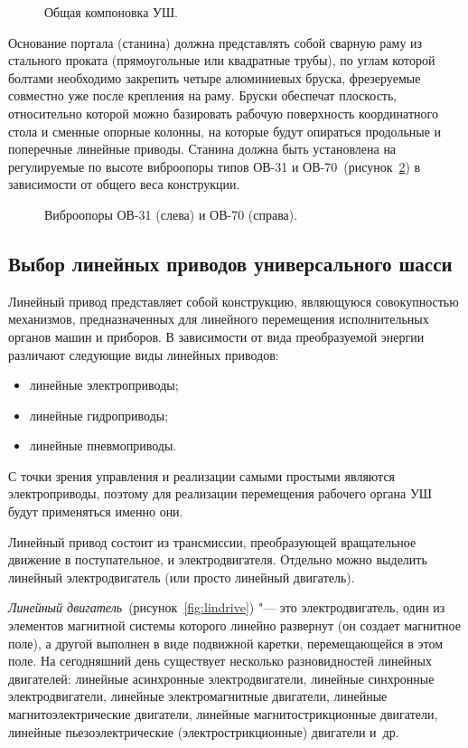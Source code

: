\begin{figure}[ht]
	\caption{Общая компоновка УШ.}\label{fig:coord-chassis}
\end{figure}

Основание портала (станина) должна представлять собой сварную раму из стального проката (прямоугольные или квадратные трубы), по углам которой болтами необходимо закрепить четыре алюминиевых бруска, фрезеруемые совместно уже после крепления на раму. Бруски обеспечат плоскость, относительно которой можно базировать рабочую поверхность координатного стола и сменные опорные колонны, на которые будут опираться продольные и поперечные линейные приводы. Станина должна быть установлена на регулируемые по высоте виброопоры типов ОВ-31 и ОВ-70~(рисунок~\cref{fig:vibro}) в зависимости от общего веса конструкции.

\begin{figure}[ht]
	\caption{Виброопоры ОВ-31 (слева) и ОВ-70 (справа).}\label{fig:vibro}
\end{figure}

\subsection{Выбор линейных приводов универсального шасси}

Линейный привод представляет собой конструкцию, являющуюся совокупностью механизмов, предназначенных для линейного перемещения исполнительных органов машин и приборов. В зависимости от вида преобразуемой энергии различают следующие виды линейных приводов:

\begin{itemize}
	\item линейные электроприводы;
	\item линейные гидроприводы;
	\item линейные пневмоприводы.
\end{itemize}

С точки зрения управления и реализации самыми простыми являются электроприводы, поэтому для реализации перемещения рабочего органа УШ будут применяться именно они.

Линейный привод состоит из трансмиссии, преобразующей вращательное движение в поступательное, и электродвигателя. Отдельно можно выделить линейный электродвигатель (или просто линейный двигатель).

\textit{Линейный двигатель}~(рисунок~\cref{fig:lindrive}) "--- это электродвигатель, один из элементов магнитной системы которого линейно развернут (он создает магнитное поле), а другой выполнен в виде подвижной каретки, перемещающейся в этом поле. На сегодняшний день существует несколько разновидностей линейных двигателей: линейные асинхронные электродвигатели, линейные синхронные электродвигатели, линейные электромагнитные двигатели, линейные магнитоэлектрические двигатели, линейные магнитострикционные двигатели, линейные пьезоэлектрические (электрострикционные) двигатели и~др.

